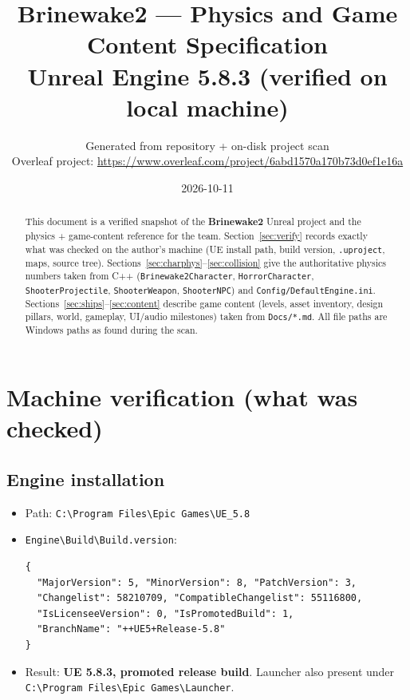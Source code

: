 \documentclass[11pt,a4paper]{article}
\title{Brinewake2 --- Physics and Game Content Specification\\ \large Unreal Engine 5.8.3 (verified on local machine)}
\author{Generated from repository + on-disk project scan\\ Overleaf project: \url{https://www.overleaf.com/project/6abd1570a170b73d0ef1e16a}}
\date{2026-10-11}
\begin{document}
\maketitle

\begin{abstract}
This document is a verified snapshot of the \textbf{Brinewake2} Unreal project and the physics + game-content reference for the team.
Section~\ref{sec:verify} records exactly what was checked on the author's machine (UE install path, build version, \texttt{.uproject}, maps, source tree).
Sections~\ref{sec:charphys}--\ref{sec:collision} give the authoritative physics numbers taken from C++ (\texttt{Brinewake2Character}, \texttt{HorrorCharacter}, \texttt{ShooterProjectile}, \texttt{ShooterWeapon}, \texttt{ShooterNPC}) and \texttt{Config/DefaultEngine.ini}.
Sections~\ref{sec:ships}--\ref{sec:content} describe game content (levels, asset inventory, design pillars, world, gameplay, UI/audio milestones) taken from \texttt{Docs/*.md}.
All file paths are Windows paths as found during the scan.
\end{abstract}

\tableofcontents
\newpage

\section{Machine verification (what was checked)}
\label{sec:verify}

\subsection{Engine installation}
\begin{itemize}[leftmargin=1.4em]
  \item Path: \texttt{C:\textbackslash Program Files\textbackslash Epic Games\textbackslash UE\_5.8}
  \item \texttt{Engine\textbackslash Build\textbackslash Build.version}:
\begin{lstlisting}
{
  "MajorVersion": 5, "MinorVersion": 8, "PatchVersion": 3,
  "Changelist": 58210709, "CompatibleChangelist": 55116800,
  "IsLicenseeVersion": 0, "IsPromotedBuild": 1,
  "BranchName": "++UE5+Release-5.8"
}
\end{lstlisting}
  \item Result: \textbf{UE 5.8.3, promoted release build}. Launcher also present under \texttt{C:\textbackslash Program Files\textbackslash Epic Games\textbackslash Launcher}.
\end{itemize}
\end{document}
